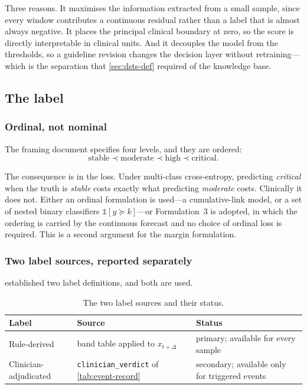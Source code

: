 \documentclass[12pt,a4paper,oneside]{report}
\begin{document}
Three reasons. It maximises the information extracted from a small sample, since every window contributes a continuous residual rather than a label that is almost always negative. It places the principal clinical boundary at zero, so the score is directly interpretable in clinical units. And it decouples the model from the thresholds, so a guideline revision changes the decision layer without retraining---which is the separation that \cref{sec:dsts-def} required of the knowledge base.

\subsection{The label}\label{sec:label-design}

\subsubsection{Ordinal, not nominal}

The framing document specifies four levels, and they are ordered:
\begin{equation}
  \text{stable} \prec \text{moderate} \prec \text{high} \prec \text{critical}.
\end{equation}

The consequence is in the loss. Under multi-class cross-entropy, predicting \emph{critical} when the truth is \emph{stable} costs exactly what predicting \emph{moderate} costs. Clinically it does not. Either an ordinal formulation is used---a cumulative-link model, or a set of nested binary classifiers $\mathbb{1}[y \succeq k]$---or Formulation~3 is adopted, in which the ordering is carried by the continuous forecast and no choice of ordinal loss is required. This is a second argument for the margin formulation.

\subsubsection{Two label sources, reported separately}\label{sec:two-labels}

 established two label definitions, and both are used.

\begin{table}[htbp]
\centering\small
\caption{The two label sources and their status.}\label{tab:label-sources}
\begin{tabularx}{\textwidth}{@{}>{\raggedright\arraybackslash}p{3.6cm} X >{\raggedright\arraybackslash}p{4.2cm}@{}}
\toprule
\textbf{Label} & \textbf{Source} & \textbf{Status} \\
\midrule
Rule-derived & band table applied to $x_{t+\Delta}$ & primary; available for every sample \\
Clinician-adjudicated & \texttt{clinician\_verdict} of \cref{tab:event-record} & secondary; available only for triggered events \\
\bottomrule
\end{tabularx}
\end{table}
\end{document}

